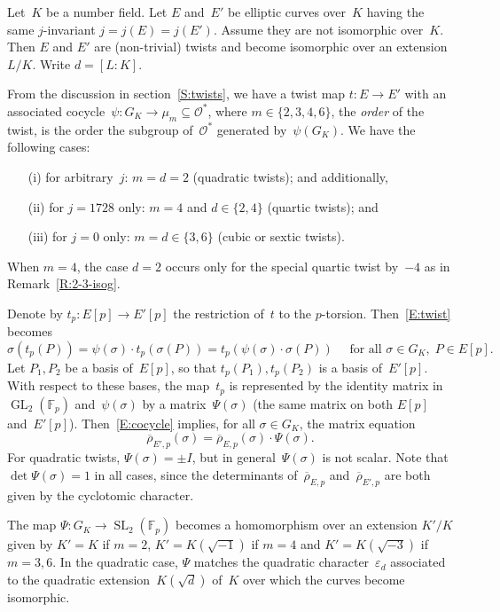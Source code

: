 \documentclass[12pt, reqno]{amsart}
\newcommand{\Fp}{\mathbb{F}_p}
\newcommand{\rhobar}{{\overline{\rho}}}
\newcommand{\calO}{\mathcal{O}}
\newcommand{\GL}{\operatorname{GL}}
\newcommand{\SL}{\operatorname{SL}}
\numberwithin{equation}{section}
\theoremstyle{definition}
\theoremstyle{remark}
\begin{document}
Let~$K$ be a number field. Let $E$ and~$E'$ be elliptic curves
over~$K$ having the same $j$-invariant $j = j(E) = j(E')$. Assume they
are not isomorphic over~$K$. Then $E$ and $E'$ are (non-trivial)
twists and become isomorphic over an extension $L/K$. Write $d = [L :
  K]$.

From the discussion in section~\ref{S:twists}, we have a twist map $t : E \to E'$ with
an associated cocycle~$\psi : G_K \to \mu_m \subseteq\calO^*$, where
$m\in\{2,3,4,6\}$, the \emph{order} of the twist, is the order the
subgroup of~$\calO^*$ generated by~$\psi(G_K)$.  We have the following
cases:
\begin{itemize}
 \item[(i)] for arbitrary~$j$: $m=d=2$ (quadratic twists); and
   additionally,
 \item[(ii)] for $j = 1728$ only: $m=4$ and $d \in \{2,4\}$  (quartic
   twists); and
  \item[(iii)] for $j = 0$ only: $m=d\in\{3,6\}$ (cubic or sextic twists).
\end{itemize}

When $m=4$, the case $d=2$ occurs only for the special
quartic twist by~$-4$ as in Remark~\ref{R:2-3-isog}.

Denote by $t_p : E[p] \to E'[p]$ the restriction of~$t$ to the
$p$-torsion. Then~\eqref{E:twist} becomes
\begin{equation}\label{E:cocycle}
  \sigma(t_p(P)) = \psi(\sigma) \cdot t_p(\sigma(P))
                 = t_p(\psi(\sigma)\cdot\sigma(P)) 
   \quad \text{ for all } \sigma \in G_K,
  \; P \in E[p].
\end{equation}
Let $P_1, P_2$ be a basis of~$E[p]$, so that $t_p(P_1), t_p(P_2)$ is a
basis of~$E'[p]$.  With respect to these bases, the map~$t_p$ is
represented by the identity matrix in~$\GL_2(\Fp)$ and~$\psi(\sigma)$
by a matrix~$\Psi(\sigma)$ (the same matrix on both $E[p]$
and~$E'[p]$).  Then~\eqref{E:cocycle} implies, for all $\sigma \in
G_K$, the matrix equation
\begin{equation} \label{E:PsiMatrix}
 \rhobar_{E',p}(\sigma) = \rhobar_{E,p}(\sigma) \cdot \Psi(\sigma). 
\end{equation}
For quadratic twists, $\Psi(\sigma)=\pm I$, but in
general~$\Psi(\sigma)$ is not scalar.  Note that $\det\Psi(\sigma)=1$
in all cases, since the determinants of~$\rhobar_{E,p}$
and~$\rhobar_{E',p}$ are both given by the cyclotomic character.

The map $\Psi:G_K\to\SL_2(\Fp)$ becomes a homomorphism over an
extension $K'/K$ given by $K'=K$ if $m=2$, $K'=K(\sqrt{-1})$ if $m=4$
and $K'=K(\sqrt{-3})$ if $m=3,6$. In the quadratic case, $\Psi$
matches the quadratic character~$\varepsilon_d$ associated to the
quadratic extension~$K(\sqrt{d})$ of~$K$ over which the curves become
isomorphic.
\end{document}
